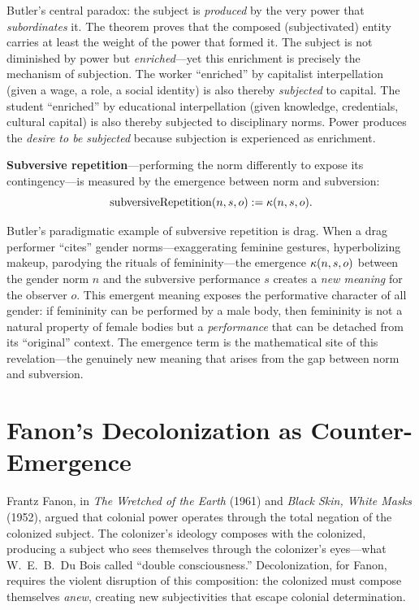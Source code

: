 \begin{interpretation}
Butler's central paradox: the subject is \emph{produced} by the very power
that \emph{subordinates} it. The theorem proves that the composed
(subjectivated) entity carries at least the weight of the power that formed
it. The subject is not diminished by power but \emph{enriched}---yet this
enrichment is precisely the mechanism of subjection. The worker ``enriched''
by capitalist interpellation (given a wage, a role, a social identity) is
also thereby \emph{subjected} to capital. The student ``enriched'' by
educational interpellation (given knowledge, credentials, cultural capital)
is also thereby subjected to disciplinary norms. Power produces the
\emph{desire to be subjected} because subjection is experienced as enrichment.
\end{interpretation}

\begin{definition}
\label{def:subversive-repetition}
\textbf{Subversive repetition}---performing the norm differently to expose its
contingency---is measured by the emergence between norm and subversion:
\[
  \mathrm{subversiveRepetition}(n, s, o) := \kappa(n, s, o).
\]
\end{definition}

\begin{interpretation}
Butler's paradigmatic example of subversive repetition is drag. When a drag
performer ``cites'' gender norms---exaggerating feminine gestures,
hyperbolizing makeup, parodying the rituals of femininity---the emergence
$\kappa(n, s, o)$ between the gender norm $n$ and the subversive performance
$s$ creates a \emph{new meaning} for the observer $o$. This emergent meaning
exposes the performative character of all gender: if femininity can be
performed by a male body, then femininity is not a natural property of female
bodies but a \emph{performance} that can be detached from its ``original''
context. The emergence term is the mathematical site of this revelation---the
genuinely new meaning that arises from the gap between norm and subversion.
\end{interpretation}

\section{Fanon's Decolonization as Counter-Emergence}

Frantz Fanon, in \emph{The Wretched of the Earth} (1961) and \emph{Black Skin,
White Masks} (1952), argued that colonial power operates through the total
negation of the colonized subject. The colonizer's ideology composes with
the colonized, producing a subject who sees themselves through the colonizer's
eyes---what W.~E.~B.\ Du Bois called ``double consciousness.'' Decolonization,
for Fanon, requires the violent disruption of this composition: the colonized
must compose themselves \emph{anew}, creating new subjectivities that escape
colonial determination.

